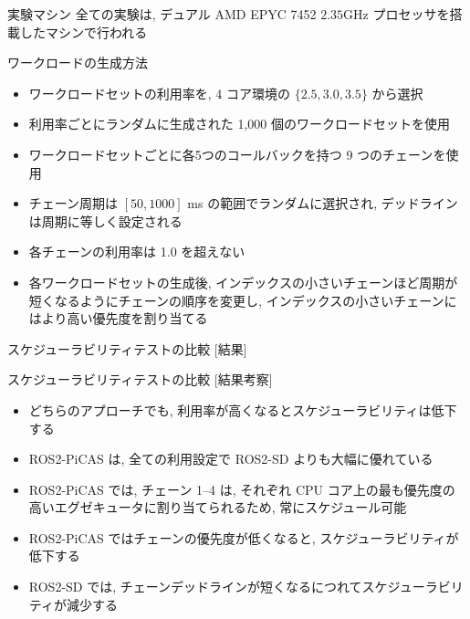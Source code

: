 \begin{frame}{実験マシン}
    全ての実験は, デュアル AMD EPYC 7452 $2.35 \mathrm{GHz}$ プロセッサを搭載したマシンで行われる
\end{frame}

\begin{frame}{ワークロードの生成方法}
    \begin{itemize}
        \item ワークロードセットの利用率を, 4 コア環境の $\{2.5,3.0,3.5\}$ から選択
        \item 利用率ごとにランダムに生成された 1,000 個のワークロードセットを使用
        \item ワークロードセットごとに各5つのコールバックを持つ 9 つのチェーンを使用
        \item チェーン周期は $[50,1000]$ ms の範囲でランダムに選択され, デッドラインは周期に等しく設定される
        \item 各チェーンの利用率は 1.0 を超えない
        \item 各ワークロードセットの生成後, インデックスの小さいチェーンほど周期が短くなるようにチェーンの順序を変更し, インデックスの小さいチェーンにはより高い優先度を割り当てる
    \end{itemize}
\end{frame}

\begin{frame}{スケジューラビリティテストの比較 [結果]}
\end{frame}

\begin{frame}{スケジューラビリティテストの比較 [結果考察]}
    \begin{itemize}
        \item どちらのアプローチでも, 利用率が高くなるとスケジューラビリティは低下する
        \item ROS2-PiCAS は, 全ての利用設定で ROS2-SD よりも大幅に優れている
        \item ROS2-PiCAS では, チェーン 1--4 は, それぞれ CPU コア上の最も優先度の高いエグゼキュータに割り当てられるため, 常にスケジュール可能
        \item ROS2-PiCAS ではチェーンの優先度が低くなると, スケジューラビリティが低下する
        \item ROS2-SD では, チェーンデッドラインが短くなるにつれてスケジューラビリティが減少する
    \end{itemize}
\end{frame}

